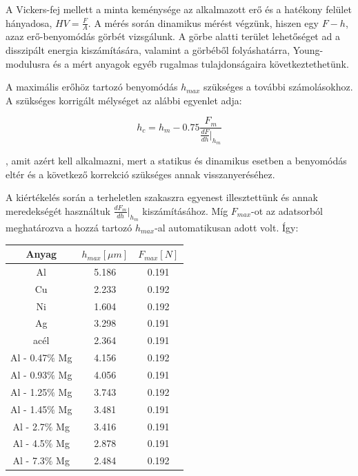\documentclass[a4paper,12pt]{article}
\begin{document}
\par A Vickers-fej mellett a minta keménysége az alkalmazott erő és a hatékony felület hányadosa, $HV = \frac{F}{A}$. A mérés során dinamikus mérést végzünk, hiszen egy $F-h$, azaz erő-benyomódás görbét vizsgálunk. A görbe alatti terület lehetőséget ad a disszipált energia kiszámítására, valamint a görbéből folyáshatárra, Young-modulusra és a mért anyagok egyéb rugalmas tulajdonságaira következtethetünk. 

\vspace{5mm}

\par A maximális erőhöz tartozó benyomódás $h_{max}$ szükséges a további számolásokhoz. A szükséges korrigált mélységet az alábbi egyenlet adja:

\begin{equation*}
h_{c} = h_{m} - 0.75\frac{F_{m}}{\frac{dF}{dh}|_{h_{m}}}
\end{equation*}

\par , amit azért kell alkalmazni, mert a statikus és dinamikus esetben a benyomódás eltér és a következő korrekció szükséges annak visszanyeréséhez. 

\par A kiértékelés során a terheletlen szakaszra egyenest illesztettünk és annak meredekségét használtuk $\frac{dF_{m}}{dh}|_{h_{m}}$ kiszámításához. Míg $F_{max}$-ot az adatsorból meghatározva a hozzá tartozó $h_{max}$-al automatikusan adott volt. Így:

\begin{center}
\begin{tabular}{|c|c|c|}
\hline
Anyag & $h_{max} [\mu m]$ & $F_{max} [N]$ \\
\hline
Al &5.186& 0.191 \\
\hline
Cu &2.233& 0.192 \\
\hline
Ni &1.604 &0.192\\
\hline
Ag &3.298& 0.191\\
\hline
acél& 2.364& 0.191\\
\hline
Al - 0.47$\%$ Mg& 4.156& 0.192\\
\hline
Al - 0.93$\%$ Mg &4.056& 0.191\\
\hline
Al - 1.25$\%$ Mg &3.743& 0.192\\
\hline
Al - 1.45$\%$ Mg &3.481 &0.191\\
\hline
Al - 2.7$\%$ Mg &3.416& 0.191\\
\hline
Al - 4.5$\%$ Mg &2.878 &0.191\\
\hline
Al - 7.3$\%$ Mg& 2.484 &0.192\\
\hline
\end{tabular}
\end{center}
\end{document}
